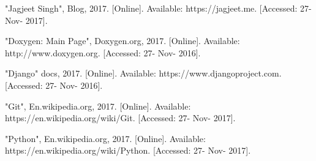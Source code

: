  
\begin{thebibliography}{22}



\bibitem{} "Jagjeet Singh", Blog, 2017. [Online]. Available: https://jagjeet.me. [Accessed: 27- Nov- 2017].

\bibitem{} "Doxygen: Main Page", Doxygen.org, 2017. [Online]. Available: http://www.doxygen.org. [Accessed: 27- Nov- 2016].

\bibitem{} "Django" docs, 2017. [Online]. Available: https://www.djangoproject.com. [Accessed: 27- Nov- 2016].

\bibitem{} "Git", En.wikipedia.org, 2017. [Online]. Available: 
https://en.wikipedia.org/wiki/Git. [Accessed: 27- Nov- 2017].

\bibitem{} "Python", En.wikipedia.org, 2017. [Online]. Available: https://en.wikipedia.org/wiki/Python. [Accessed: 27- Nov- 2017].

\end{thebibliography}
